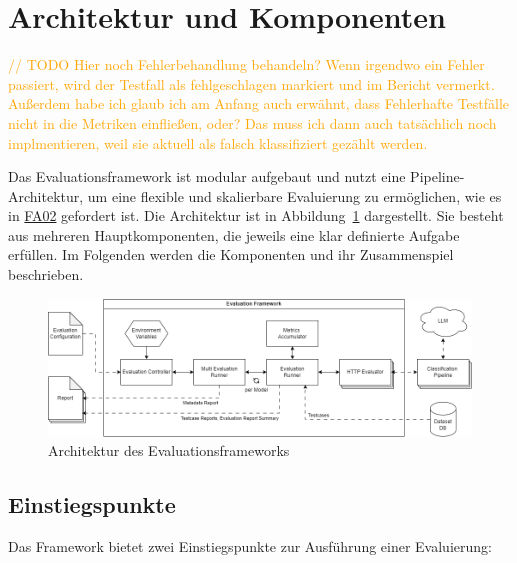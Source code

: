 \section{Architektur und Komponenten}\label{sec:architektur-und-komponenten}

\textcolor{orange}{// TODO Hier noch Fehlerbehandlung behandeln? Wenn irgendwo ein Fehler passiert, wird der Testfall als fehlgeschlagen markiert und im Bericht vermerkt. Außerdem habe ich glaub ich am Anfang auch erwähnt, dass Fehlerhafte Testfälle nicht in die Metriken einfließen, oder? Das muss ich dann auch tatsächlich noch implmentieren, weil sie aktuell als falsch klassifiziert gezählt werden.}

Das Evaluationsframework ist modular aufgebaut und nutzt eine Pipeline-Architektur, um eine flexible und skalierbare Evaluierung zu ermöglichen, wie es in \hyperlink{FA02}{FA02} gefordert ist. Die Architektur ist in Abbildung~\ref{fig:evaluation-framework-architecture} dargestellt. Sie besteht aus mehreren Hauptkomponenten, die jeweils eine klar definierte Aufgabe erfüllen. Im Folgenden werden die Komponenten und ihr Zusammenspiel beschrieben.

\begin{figure}
    \centering
    \includegraphics[width=\linewidth]{images/evaluation/evaluation-framework-architecture.drawio}
    \caption{Architektur des Evaluationsframeworks}
    \label{fig:evaluation-framework-architecture}
\end{figure}

\subsection*{Einstiegspunkte}

Das Framework bietet zwei Einstiegspunkte zur Ausführung einer Evaluierung:

